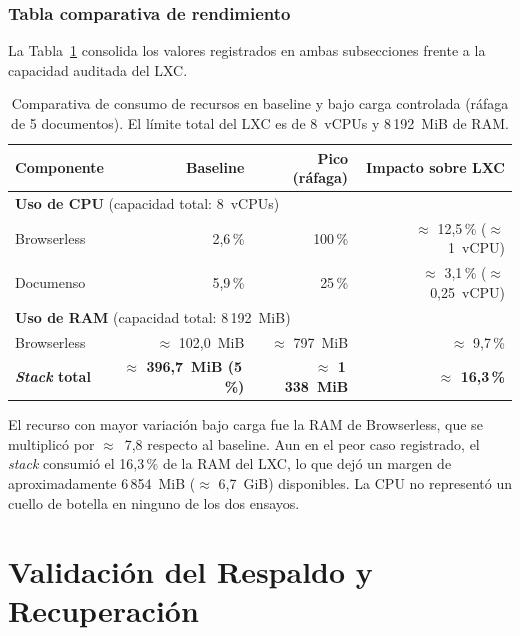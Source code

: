 \subsubsection*{Tabla comparativa de rendimiento}

La Tabla~\ref{tab:metricas_rendimiento} consolida los valores registrados en ambas subsecciones frente a la capacidad auditada del LXC.

\begin{table}[!htbp]
    \centering
    \caption[Métricas de rendimiento: baseline vs.\ pico bajo carga]{Comparativa de consumo de recursos en baseline y bajo carga controlada (ráfaga de 5 documentos). El límite total del LXC es de 8~vCPUs y 8\,192~MiB de RAM.}
    \label{tab:metricas_rendimiento}
    \begin{tabular}{l r r r}
        \toprule
        \textbf{Componente} & \textbf{Baseline} & \textbf{Pico (ráfaga)} & \textbf{Impacto sobre LXC} \\
        \midrule
        \multicolumn{4}{l}{\textbf{Uso de CPU} (capacidad total: 8~vCPUs)} \\
        \quad Browserless   & 2,6\,\%    & 100\,\%              & \(\approx\) 12,5\,\% (\(\approx\) 1~vCPU) \\
        \quad Documenso     & 5,9\,\%    & 25\,\%   & \(\approx\) 3,1\,\% (\(\approx\) 0,25~vCPU) \\
        \midrule
        \multicolumn{4}{l}{\textbf{Uso de RAM} (capacidad total: 8\,192~MiB)} \\
        \quad Browserless             & \(\approx\) 102,0~MiB  & \(\approx\) 797~MiB & \(\approx\) 9,7\,\% \\
        \quad \textbf{\textit{Stack} total}    & \textbf{\(\approx\) 396,7~MiB (5\,\%)} & \textbf{\(\approx\) 1\,338~MiB} & \textbf{\(\approx\) 16,3\,\%} \\
        \bottomrule
    \end{tabular}
\end{table}

\FloatBarrier

El recurso con mayor variación bajo carga fue la RAM de Browserless, que se multiplicó por \(\approx\)~7,8 respecto al baseline. Aun en el peor caso registrado, el \textit{stack} consumió el 16,3\,\% de la RAM del LXC, lo que dejó un margen de aproximadamente 6\,854~MiB (\(\approx\) 6,7~GiB) disponibles. La CPU no representó un cuello de botella en ninguno de los dos ensayos.

\section{Validación del Respaldo y Recuperación}
\label{sec:validacion_respaldo}

